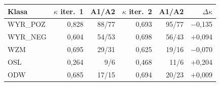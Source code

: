 \begin{tabular}{lrrrrr}
\toprule
Klasa & $\kappa$ iter.~1 & A1/A2 & $\kappa$ iter.~2 & A1/A2 & $\Delta\kappa$ \\
\midrule
WYR\_POZ & 0{,}828 & 88/77 & 0{,}693 & 95/77 & $-$0{,}135 \\
WYR\_NEG & 0{,}604 & 54/53 & 0{,}698 & 56/43 & $+$0{,}094 \\
WZM & 0{,}695 & 29/31 & 0{,}625 & 19/16 & $-$0{,}070 \\
OSL & 0{,}264 & 9/6 & 0{,}468 & 11/6 & $+$0{,}204 \\
ODW & 0{,}685 & 17/15 & 0{,}694 & 20/23 & $+$0{,}009 \\
\bottomrule
\end{tabular}
